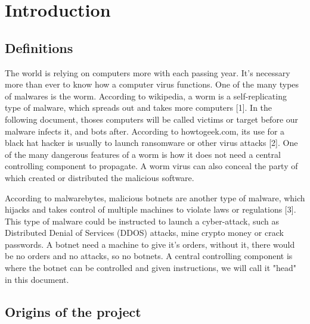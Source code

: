 \documentclass[../main.tex]{subfiles}
\begin{document}
    \newpage

	\chapter{Introduction}

    \section{Definitions}

    The world is relying on computers more with each passing year.
    It's necessary more than ever to know how a computer virus functions. 
    One of the many types of malwares is the worm.
    According to wikipedia, a worm is a self-replicating type of malware, which spreads out and takes more computers [1].
    In the following document, thoses computers will be called victims or target before our malware infects it, and bots after. 
    According to howtogeek.com, its use for a black hat hacker is usually to launch ransomware or other virus attacks [2]. 
    One of the many dangerous features of a worm is how it does not need a central controlling component to propagate. 
    A worm virus can also conceal the party of which created or distributed the malicious software. 

    According to malwarebytes, malicious botnets are another type of malware, which hijacks and takes control of multiple machines to violate laws or regulations [3]. 
    This type of malware could be instructed to launch a cyber-attack, such as Distributed Denial of Services (DDOS) attacks, mine crypto money or crack passwords. 
    A botnet need a machine to give it's orders, without it, there would be no orders and no attacks, so no botnets.
    A central controlling component is where the botnet can be controlled and given instructions, we will call it "head" in this document. 

	\vspace{10pt}
    
    \section{Origins of the project}
\end{document}
